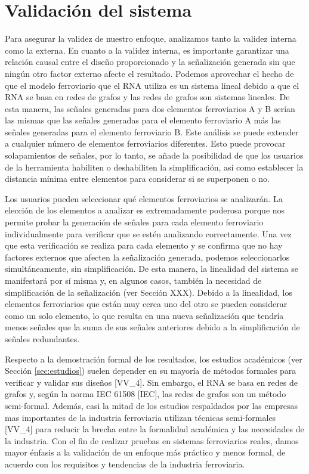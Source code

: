 \section{Validación del sistema}

    Para asegurar la validez de nuestro enfoque, analizamos tanto la validez interna como la externa. En cuanto a la validez interna, es importante garantizar una relación causal entre el diseño proporcionado y la señalización generada sin que ningún otro factor externo afecte el resultado. Podemos aprovechar el hecho de que el modelo ferroviario que el RNA utiliza es un sistema lineal debido a que el RNA se basa en redes de grafos y las redes de grafos son sistemas lineales. De esta manera, las señales generadas para dos elementos ferroviarios A y B serían las mismas que las señales generadas para el elemento ferroviario A más las señales generadas para el elemento ferroviario B. Este análisis se puede extender a cualquier número de elementos ferroviarios diferentes. Esto puede provocar solapamientos de señales, por lo tanto, se añade la posibilidad de que los usuarios de la herramienta habiliten o deshabiliten la simplificación, así como establecer la distancia mínima entre elementos para considerar si se superponen o no.

    Los usuarios pueden seleccionar qué elementos ferroviarios se analizarán. La elección de los elementos a analizar es extremadamente poderosa porque nos permite probar la generación de señales para cada elemento ferroviario individualmente para verificar que se estén analizando correctamente. Una vez que esta verificación se realiza para cada elemento y se confirma que no hay factores externos que afecten la señalización generada, podemos seleccionarlos simultáneamente, sin simplificación. De esta manera, la linealidad del sistema se manifestará por sí misma y, en algunos casos, también la necesidad de simplificación de la señalización (ver Sección XXX). Debido a la linealidad, los elementos ferroviarios que están muy cerca uno del otro se pueden considerar como un solo elemento, lo que resulta en una nueva señalización que tendría menos señales que la suma de sus señales anteriores debido a la simplificación de señales redundantes.

    Respecto a la demostración formal de los resultados, los estudios académicos (ver Sección \ref{sec:estudios}) suelen depender en su mayoría de métodos formales para verificar y validar sus diseños [VV\_4]. Sin embargo, el RNA se basa en redes de grafos y, según la norma IEC 61508 [IEC], las redes de grafos son un método semi-formal. Además, casi la mitad de los estudios respaldados por las empresas mas importantes de la industria ferroviaria utilizan técnicas semi-formales [VV\_4] para reducir la brecha entre la formalidad académica y las necesidades de la industria. Con el fin de realizar pruebas en sistemas ferroviarios reales, damos mayor énfasis a la validación de un enfoque más práctico y menos formal, de acuerdo con los requisitos y tendencias de la industria ferroviaria.
    
